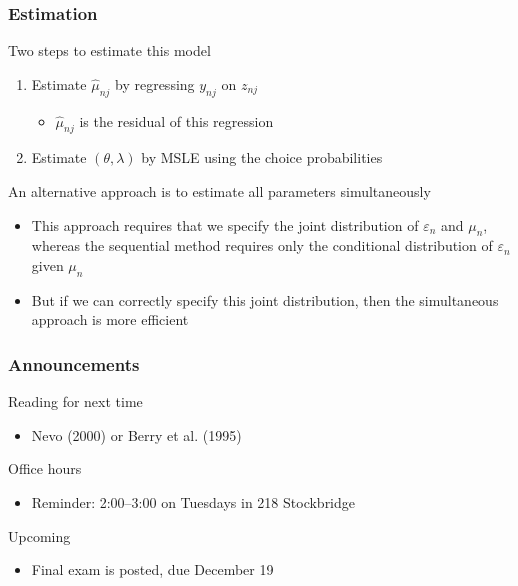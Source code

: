 \documentclass{beamer}
\begin{document}
\begin{frame}\frametitle{Estimation}
    Two steps to estimate this model
    \begin{enumerate}
        \item Estimate $\hat{\mu}_{nj}$ by regressing $y_{nj}$ on $z_{nj}$
        \begin{itemize}
            \item $\hat{\mu}_{nj}$ is the residual of this regression
        \end{itemize}
        \item Estimate $(\theta, \lambda)$ by MSLE using the choice probabilities
    \end{enumerate}
    \vspace{2ex}
    An alternative approach is to estimate all parameters simultaneously
    \begin{itemize}
        \item This approach requires that we specify the joint distribution of $\varepsilon_n$ and $\mu_n$, whereas the sequential method requires only the conditional distribution of $\varepsilon_n$ given $\mu_n$
        \item But if we can correctly specify this joint distribution, then the simultaneous approach is more efficient
    \end{itemize}
\end{frame}

\begin{frame}\frametitle{Announcements}
    Reading for next time
    \begin{itemize}
        \item Nevo (2000) or Berry et al. (1995)
    \end{itemize}
    \vspace{3ex}
    Office hours
    \begin{itemize}
    	\item Reminder: 2:00--3:00 on Tuesdays in 218 Stockbridge
    \end{itemize}
    \vspace{3ex}
    Upcoming
    \begin{itemize}
        \item Final exam is posted, due December 19
    \end{itemize}
\end{frame}
\end{document}
